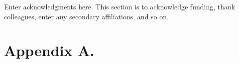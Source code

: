 \documentclass[draft]{AR_analysis_}
\begin{document}
\acknowledgments
Enter acknowledgments here. This section is to acknowledge funding, thank colleagues, 
enter any secondary affiliations, and so on.


%
%

%



%
%
%
%
%

\appendix
\section*{Appendix A.}
\end{document}
